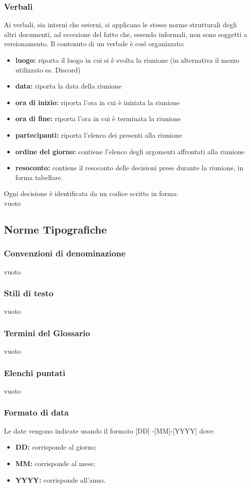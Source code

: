 \subsubsection{Verbali}
Ai verbali, sia interni che esterni, si applicano le stesse norme strutturali degli altri documenti, ad eccezione del fatto che, essendo informali, non sono soggetti a versionamento. Il contenuto di un verbale è così organizzato:
\begin{itemize}
\item \textbf{luogo:} riporta il luogo in cui si è svolta la riunione (in alternativa il mezzo utilizzato es. Discord)
	\item \textbf{data:} riporta la data della riunione
		\item \textbf{ora di inizio:} riporta l'ora in cui è iniziata la riunione
			\item \textbf{ora di fine:} riporta l'ora in cui è terminata la riunione
				\item \textbf{partecipanti:} riporta l'elenco dei presenti alla riunione
					\item \textbf{ordine del giorno:} contiene l'elenco degli argomenti affrontati alla riunione
						\item \textbf{resoconto:}  contiene il resoconto delle decisioni prese durante la riunione, in forma tabellare.	
\end{itemize}
Ogni decisione è identificata da un codice scritto in forma: 
\\
{vuoto}
\subsection{Norme Tipografiche}
\subsubsection{Convenzioni di denominazione}
{vuoto}
\subsubsection{Stili di testo}
{vuoto}
\subsubsection{Termini del Glossario}
{vuoto}
\subsubsection{Elenchi puntati}
{vuoto}
\subsubsection{Formato di data}
Le date vengono indicate usando il formato
[DD] -[MM]-[YYYY] dove:
\\
\begin{itemize}
\item \textbf{DD:} corrisponde al giorno;
	\item \textbf{MM:} corrisponde al mese;
		\item \textbf{YYYY:} corrisponde all'anno.
\end{itemize}
